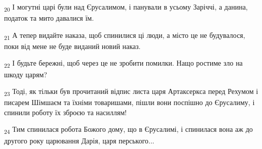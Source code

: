 \begin{tcolorbox}
\textsubscript{20} І могутні царі були над Єрусалимом, і панували в усьому Заріччі, а данина, податок та мито давалися їм.
\end{tcolorbox}
\begin{tcolorbox}
\textsubscript{21} А тепер видайте наказа, щоб спинилися ці люди, а місто це не будувалося, поки від мене не буде виданий новий наказ.
\end{tcolorbox}
\begin{tcolorbox}
\textsubscript{22} І будьте бережні, щоб через це не зробити помилки. Нащо ростиме зло на шкоду царям?
\end{tcolorbox}
\begin{tcolorbox}
\textsubscript{23} Тоді, як тільки був прочитаний відпис листа царя Артаксеркса перед Рехумом і писарем Шімшаєм та їхніми товаришами, пішли вони поспішно до Єрусалиму, і спинили роботу їх зброєю та насиллям!
\end{tcolorbox}
\begin{tcolorbox}
\textsubscript{24} Тим спинилася робота Божого дому, що в Єрусалимі, і спинилася вона аж до другого року царювання Дарія, царя перського...
\end{tcolorbox}
